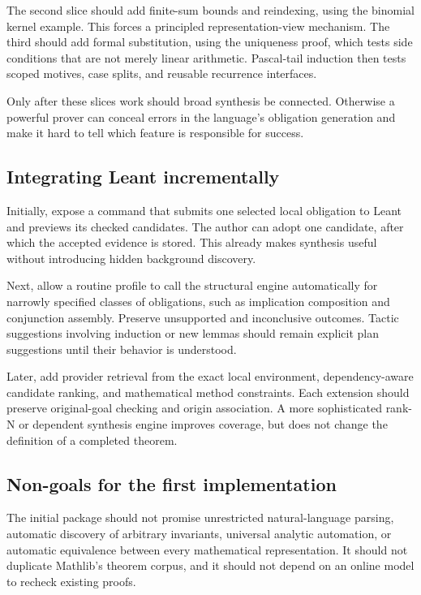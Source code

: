 \documentclass[11pt,a4paper]{article}
\begin{document}
The second slice should add finite-sum bounds and reindexing, using the binomial kernel example. This forces a principled representation-view mechanism. The third should add formal substitution, using the uniqueness proof, which tests side conditions that are not merely linear arithmetic. Pascal-tail induction then tests scoped motives, case splits, and reusable recurrence interfaces.

Only after these slices work should broad synthesis be connected. Otherwise a powerful prover can conceal errors in the language's obligation generation and make it hard to tell which feature is responsible for success.

\subsection{Integrating Leant incrementally}

Initially, expose a command that submits one selected local obligation to Leant and previews its checked candidates. The author can adopt one candidate, after which the accepted evidence is stored. This already makes synthesis useful without introducing hidden background discovery.

Next, allow a routine profile to call the structural engine automatically for narrowly specified classes of obligations, such as implication composition and conjunction assembly. Preserve unsupported and inconclusive outcomes. Tactic suggestions involving induction or new lemmas should remain explicit plan suggestions until their behavior is understood.

Later, add provider retrieval from the exact local environment, dependency-aware candidate ranking, and mathematical method constraints. Each extension should preserve original-goal checking and origin association. A more sophisticated rank-N or dependent synthesis engine improves coverage, but does not change the definition of a completed theorem.

\subsection{Non-goals for the first implementation}

The initial package should not promise unrestricted natural-language parsing, automatic discovery of arbitrary invariants, universal analytic automation, or automatic equivalence between every mathematical representation. It should not duplicate Mathlib's theorem corpus, and it should not depend on an online model to recheck existing proofs.
\end{document}
